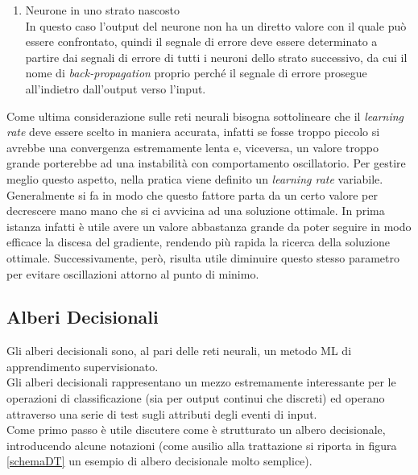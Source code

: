 \begin{enumerate}
	\item Neurone in uno strato nascosto \\
	In questo caso l'output del neurone non ha un diretto valore con il quale può essere confrontato, quindi il segnale di errore deve essere determinato a partire dai segnali di errore di tutti i neuroni dello strato successivo, da cui il nome di \textit{back-propagation} proprio perché il segnale di errore prosegue all'indietro dall'output verso l'input.
\end{enumerate}
Come ultima considerazione sulle reti neurali bisogna sottolineare che il \textit{learning rate} deve essere scelto in maniera accurata, infatti se fosse troppo piccolo si avrebbe una convergenza estremamente lenta e, viceversa, un valore troppo grande porterebbe ad una instabilità con comportamento oscillatorio. Per gestire meglio questo aspetto, nella pratica viene definito un \textit{learning rate} variabile. Generalmente si fa in modo che questo fattore parta da un certo valore per decrescere mano mano che si ci avvicina ad una soluzione ottimale. In prima istanza infatti è utile avere un valore abbastanza grande da poter seguire in modo efficace la discesa del gradiente, rendendo più rapida la ricerca della soluzione ottimale. Successivamente, però, risulta utile diminuire questo stesso parametro per evitare oscillazioni attorno al punto di minimo.

\newpage


\subsection{Alberi Decisionali}
\label{alberi decisionali}
Gli alberi decisionali sono, al pari delle reti neurali, un metodo ML di apprendimento supervisionato.\\
Gli alberi decisionali rappresentano un mezzo estremamente interessante per le operazioni di classificazione (sia per output continui che discreti) ed operano attraverso una serie di test sugli attributi degli eventi di input. \\ 
Come primo passo è utile discutere come è strutturato un albero decisionale, introducendo alcune notazioni (come ausilio alla trattazione si riporta in figura \ref{schemaDT} un esempio di albero decisionale molto semplice). \\

